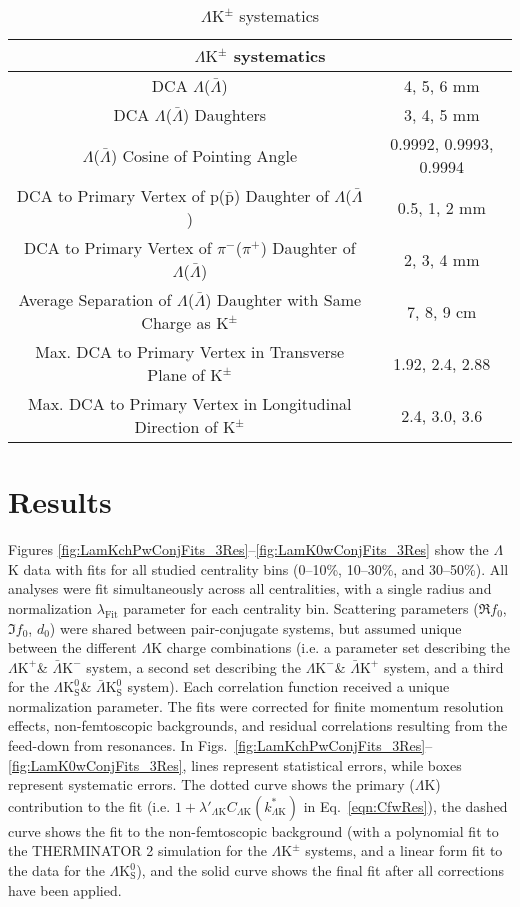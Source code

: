 \documentclass[ALICE,manyauthors]{cernphprep}
\newcommand{\LamALam}{$\Lambda$($\bar{\Lambda}$)\xspace}
\newcommand{\Kpm}{$\mathrm{K^{\pm}}$\xspace}
\newcommand{\LamK}{$\Lambda$K\xspace}
\newcommand{\LamKchP}{$\Lambda\mathrm{K^{+}}$\xspace}
\newcommand{\ALamKchM}{$\bar{\Lambda}\mathrm{K^{-}}$\xspace}
\newcommand{\LamKchM}{$\Lambda\mathrm{K^{-}}$\xspace}
\newcommand{\ALamKchP}{$\bar{\Lambda}\mathrm{K^{+}}$\xspace}
\newcommand{\LamKpm}{$\Lambda\mathrm{K^{\pm}}$\xspace}
\newcommand{\LamKs}{$\Lambda\mathrm{K^{0}_{S}}$\xspace}
\newcommand{\ALamKs}{$\bar{\Lambda}\mathrm{K^{0}_{S}}$\xspace}
\begin{document}
\begin{table}[htbp]
 \centering 
  \renewcommand{\arraystretch}{1.2}
  \begin{tabular}{c|c}
   \multicolumn{2}{c}{\LamKpm systematics} \\
   \hline  
   DCA \LamALam & 4, 5, 6 mm \\
   \hline
   DCA \LamALam Daughters & 3, 4, 5 mm \\
   \hline
   \LamALam Cosine of Pointing Angle & 0.9992, 0.9993, 0.9994 \\
   \hline
   DCA to Primary Vertex of p($\bar{\mathrm{p}}$) Daughter of \LamALam &  0.5, 1, 2 mm \\
   \hline
   DCA to Primary Vertex of $\pi^{-}$($\pi^{+}$) Daughter of \LamALam &  2, 3, 4 mm  \\
   \hline
   Average Separation of \LamALam Daughter with Same Charge as \Kpm & 7, 8, 9 cm \\
   \hline
   Max. DCA to Primary Vertex in Transverse Plane of \Kpm & 1.92, 2.4, 2.88 \\
   \hline
   Max. DCA to Primary Vertex in Longitudinal Direction of \Kpm & 2.4, 3.0, 3.6 \\
   \hline
  \end{tabular}
 \caption{\LamKpm systematics}
 \label{tab:LamKchSystematics} 
\end{table}



\section{Results}
\label{sec:Results}

Figures \ref{fig:LamKchPwConjFits_3Res}--\ref{fig:LamK0wConjFits_3Res} show the \LamK data with fits for all studied centrality bins (0--10\%, 10--30\%, and 30--50\%). 
All analyses were fit simultaneously across all centralities, with a single radius and normalization $\lambda_{\mathrm{Fit}}$ parameter for each centrality bin.
Scattering parameters ($\Re f_{0}$, $\Im f_{0}$, $d_{0}$) were shared between pair-conjugate systems, but assumed unique between the different \LamK charge combinations (i.e. a parameter set describing the \LamKchP \& \ALamKchM system, a second set describing the \LamKchM \& \ALamKchP system, and a third for the \LamKs \& \ALamKs system).
Each correlation function received a unique normalization parameter.
The fits were corrected for finite momentum resolution effects, non-femtoscopic backgrounds, and residual correlations resulting from the feed-down from resonances.
In Figs.\ \ref{fig:LamKchPwConjFits_3Res}--\ref{fig:LamK0wConjFits_3Res}, lines represent statistical errors, while boxes represent systematic errors.  
The dotted curve shows the primary (\LamK) contribution to the fit (i.e. $1 + \lambda'_{\Lambda\mathrm{K}}C_{\Lambda\mathrm{K}}(k^{*}_{\Lambda\mathrm{K}})$ in Eq.\ \ref{eqn:CfwRes}), the dashed curve shows the fit to the non-femtoscopic background (with a polynomial fit to the THERMINATOR 2 simulation for the \LamKpm systems, and a linear form fit to the data for the \LamKs), and the solid curve shows the final fit after all corrections have been applied.
\end{document}
